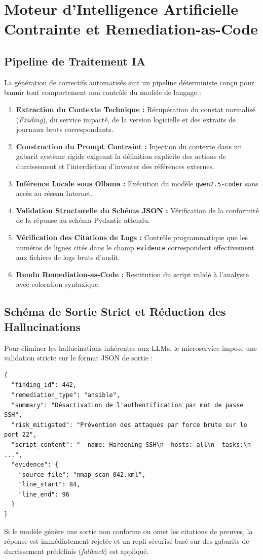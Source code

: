 \section{Moteur d'Intelligence Artificielle Contrainte et Remediation-as-Code}
\subsection{Pipeline de Traitement IA}
\par La g\'en\'eration de correctifs automatis\'es suit un pipeline d\'eterministe con\c{c}u pour bannir tout comportement non contr\^ol\'e du mod\`ele de langage :
\begin{enumerate}
    \item \textbf{Extraction du Contexte Technique :} R\'ecup\'eration du constat normalis\'e (\textit{Finding}), du service impact\'e, de la version logicielle et des extraits de journaux bruts correspondants.
    \item \textbf{Construction du Prompt Contraint :} Injection du contexte dans un gabarit syst\`eme rigide exigeant la d\'efinition explicite des actions de durcissement et l'interdiction d'inventer des r\'ef\'erences externes.
    \item \textbf{Inf\'erence Locale sous Ollama :} Ex\'ecution du mod\`ele \texttt{qwen2.5-coder} sans acc\`es au r\'eseau Internet.
    \item \textbf{Validation Structurelle du Sch\'ema JSON :} V\'erification de la conformit\'e de la r\'eponse au sch\'ema Pydantic attendu.
    \item \textbf{V\'erification des Citations de Logs :} Contr\^ole programmatique que les num\'eros de lignes cit\'es dans le champ \texttt{evidence} correspondent effectivement aux fichiers de logs bruts d'audit.
    \item \textbf{Rendu Remediation-as-Code :} Restitution du script valid\'e \`a l'analyste avec coloration syntaxique.
\end{enumerate}

\subsection{Sch\'ema de Sortie Strict et R\'eduction des Hallucinations}
\par Pour \'eliminer les hallucinations inh\'erentes aux LLMs, le microservice impose une validation stricte sur le format JSON de sortie :
\begin{verbatim}
{
  "finding_id": 442,
  "remediation_type": "ansible",
  "summary": "Désactivation de l'authentification par mot de passe SSH",
  "risk_mitigated": "Prévention des attaques par force brute sur le port 22",
  "script_content": "- name: Hardening SSH\n  hosts: all\n  tasks:\n ...",
  "evidence": {
    "source_file": "nmap_scan_042.xml",
    "line_start": 84,
    "line_end": 96
  }
}
\end{verbatim}
\par Si le mod\`ele g\'en\`ere une sortie non conforme ou omet les citations de preuves, la r\'eponse est imm\'ediatement rejet\'ee et un repli s\'ecuris\'e bas\'e sur des gabarits de durcissement pr\'ed\'efinis (\textit{fallback}) est appliqu\'e.

